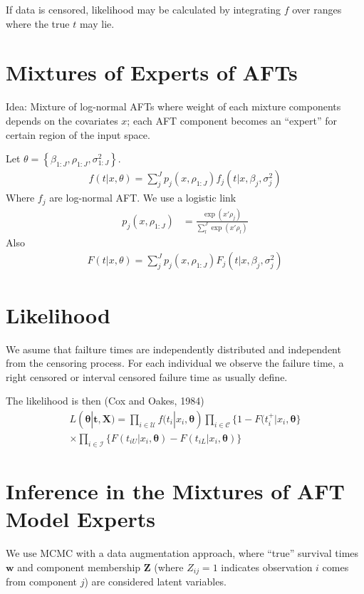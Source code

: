 \documentclass[11pt,letterpaper]{article}
\begin{document}
If data is censored, likelihood may be calculated by integrating $f$ over ranges where the true $t$ may lie.

\section{Mixtures of Experts of AFTs}

Idea: Mixture of log-normal AFTs where weight of each mixture components depends on
the covariates $x$; each AFT component becomes an ``expert'' for certain region of the input space.

Let $\theta = \left\{ \beta_{1:J}, \rho_{1:J}, \sigma^2_{1:J} \right\}$.
\begin{align*}
    f(t|x, \theta) = \sum_{j}^J p_j(x, \rho_{1:J}) f_j(t|x, \beta_j, \sigma^2_j)
\end{align*}
Where $f_j$ are log-normal AFT. We use a logistic link
\begin{align*}
    p_j(x, \rho_{1:J}) &= \frac{\exp(x'\rho_j)}{\sum_l^J \exp(x'\rho_l)}
\end{align*}
Also
\begin{align*}
    F(t|x, \theta) = \sum_{j}^J p_j(x, \rho_{1:J}) F_j(t|x, \beta_j, \sigma^2_j)
\end{align*}
\section{Likelihood}
We asume that failture times are  independently distributed and independent from the censoring process. For each individual we observe the failure time, a right censored or interval censored failure time as usually define.

The likelihood is then (Cox and Oakes, 1984)
\begin{align}
\nonumber    L(\mathbf \theta | \mathbf{t} , \mathbf{X}) = \prod_{i\in \mathcal{U}}{} f(t_i| x_i, \mathbf{\theta})\prod_{i\in \mathcal{C} }\{1-F(t_i^+|x_i, \mathbf{\theta} \}\\
    \times \prod_{i\in \mathcal{I} }\{F(t_{iU}|x_i, \mathbf{\theta})-F(t_{iL}|x_i, \mathbf{\theta}) \}
\end{align}

\section{Inference in the Mixtures of AFT Model Experts}
We use MCMC with a data augmentation approach, where ``true'' survival times $
\mathbf{w}$ and component membership $\mathbf{Z}$ (where $Z_{ij}=1$ indicates
observation $i$ comes from component $j$) are considered latent variables.
\end{document}
